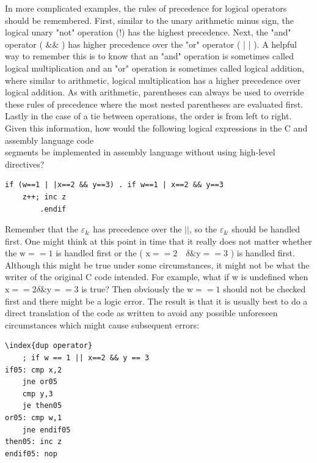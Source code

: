 \documentclass[10pt]{book}
\begin{document}
In more complicated examples, the rules of precedence for logical operators should be remembered. First, similar to the unary arithmetic minus sign, the logical unary "not" operation (!) has the highest precedence. Next, the "and" operator ( $\& \&$ ) has higher precedence over the "or" operator ( | | ). A helpful way to remember this is to know that an "and" operation is sometimes called logical multiplication and an "or" operation is sometimes called logical addition, where similar to arithmetic, logical multiplication has a higher precedence over logical addition. As with arithmetic, parentheses can always be used to override these rules of precedence where the most nested parentheses are evaluated first. Lastly in the case of a tie between operations, the order is from left to right. Given this information, how would the following logical expressions in the C and assembly language code\\
segments be implemented in assembly language without using high-level directives?


\begin{verbatim}
if (w==1 | |x==2 && y==3) . if w==1 | x==2 && y==3
    z++; inc z
        .endif
\end{verbatim}

Remember that the $\varepsilon_{\&}$ has precedence over the $\left|\mid\right.$, so the $\varepsilon_{\&}$ should be handled first. One might think at this point in time that it really does not matter whether the $\mathrm{w}==1$ is handled first or the ( $\mathrm{x}==2 \quad \delta \& \mathrm{y}==3$ ) is handled first. Although this might be true under some circumstances, it might not be what the writer of the original C code intended. For example, what if w is undefined when $\mathrm{x}==2 \delta \& \mathrm{y}==3$ is true? Then obviously the $\mathrm{w}==1$ should not be checked first and there might be a logic error. The result is that it is usually best to do a direct translation of the code as written to avoid any possible unforeseen circumstances which might cause subsequent errors:

\begin{verbatim}\index{dup operator}
    ; if w == 1 || x==2 && y == 3
if05: cmp x,2
    jne or05
    cmp y,3
    je then05
or05: cmp w,1
    jne endif05
then05: inc z
endif05: nop
\end{verbatim}
\end{document}
